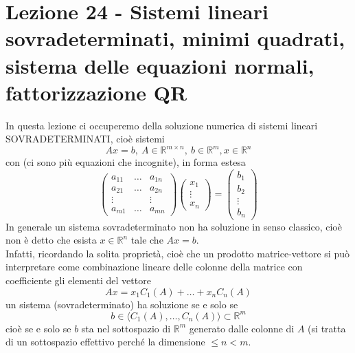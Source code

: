 \documentclass[12pt,a4paper]{article}
\begin{document}
\section[Lezione 24 - Sistemi lineari sovradeterminati, fattorizzazione QR]{Lezione 24 - Sistemi lineari sovradeterminati, minimi quadrati, sistema delle equazioni normali, fattorizzazione QR}

In questa lezione ci occuperemo della soluzione numerica di sistemi lineari SOVRADETERMINATI, cioè sistemi
\begin{equation*}
    Ax=b, \ A\in \mathbb{R}^{m\times n}, \ b\in \mathbb{R}^m, x\in \mathbb{R}^n
\end{equation*}
con  (ci sono più equazioni che incognite), in forma estesa
\begin{equation*}
    \begin{pmatrix}
        a_{11} & \dots & a_{1n} \\
        a_{21} & \dots & a_{2n} \\
        \vdots &  & \vdots \\
        a_{m1} & \dots & a_{mn} 
    \end{pmatrix}
    \begin{pmatrix}
        x_1 \\
        \vdots \\
        x_n
    \end{pmatrix}=
    \begin{pmatrix}
        b_1 \\
        b_2 \\
        \vdots \\
        b_n
    \end{pmatrix}
\end{equation*}
In generale un sistema sovradeterminato non ha soluzione in senso classico, cioè non è detto che esista $x \in \mathbb{R}^n$ tale che $Ax=b$. \\
Infatti, ricordando la solita proprietà, cioè che un prodotto matrice-vettore si può interpretare come combinazione lineare delle colonne della matrice con coefficiente gli elementi del vettore
\begin{equation*}
    Ax=x_1 C_1(A) + \dots + x_n C_n(A)
\end{equation*}
un sistema (sovradeterminato) ha soluzione se e solo se
\begin{equation*}
    b \in \langle C_1(A), \dots, C_n(A) \rangle \subset \mathbb{R}^m
\end{equation*}
cioè se e solo se $b$ sta nel sottospazio di $\mathbb{R}^m$ generato dalle colonne di $A$ (si tratta di un sottospazio effettivo perché la dimensione $\leq n < m$. \\
\end{document}
